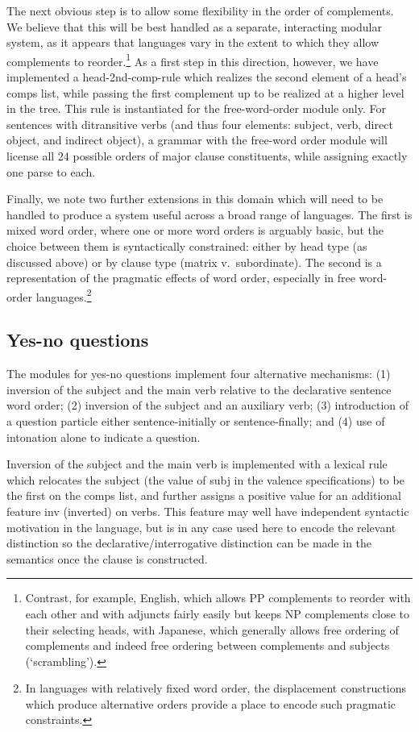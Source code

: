 \documentclass[11pt]{article}
\begin{document}
The next obvious step is to allow some flexibility in the order of
complements.  We believe that this will be best handled as a separate,
interacting modular system, as it appears that languages vary in the
extent to which they allow complements to reorder.\footnote{Contrast,
for example, English, which allows PP complements to reorder with each
other and with adjuncts fairly easily but keeps NP complements close
to their selecting heads, with Japanese, which generally allows free
ordering of complements and indeed free ordering between complements
and subjects (`scrambling').}  As a first step in this direction,
however, we have implemented a head-2nd-comp-rule which realizes the
second element of a head's {\sc comps} list, while passing the first
complement up to be realized at a higher level in the tree.  This rule
is instantiated for the free-word-order module only.  For sentences
with ditransitive verbs (and thus four elements: subject, verb, direct
object, and indirect object), a grammar with the free-word order
module will license all 24 possible orders of major clause
constituents, while assigning exactly one parse to each.

Finally, we note two further extensions in this domain which will need
to be handled to produce a system useful across a broad range of
languages.  The first is mixed word order, where one or more word
orders is arguably basic, but the choice between them is syntactically
constrained: either by head type (as discussed above) or by clause
type (matrix v.\ subordinate).  The second is a representation of the
pragmatic effects of word order, especially in free word-order
languages.\footnote{In languages with relatively fixed word order, the
displacement constructions which produce alternative orders provide a
place to encode such pragmatic constraints.}


\subsection{Yes-no questions}

The modules for yes-no questions implement four alternative mechanisms:
(1) inversion of the subject and the main verb relative to the declarative
sentence word order; (2) inversion of the subject and an auxiliary
verb; (3) introduction of a question particle either sentence-initially or
sentence-finally; and (4) use of intonation alone to indicate a question.

Inversion of the subject and the main verb is implemented with a lexical
rule which relocates the subject (the value of {\sc subj} in the valence
specifications) to be the first on the {\sc comps} list, and further
assigns a positive value for an additional feature {\sc inv} (inverted)
on verbs.  This feature may well have independent syntactic motivation in 
the language, but is in any case used here to encode the relevant distinction
so the declarative/interrogative distinction can be made in the semantics
once the clause is constructed.
\end{document}
